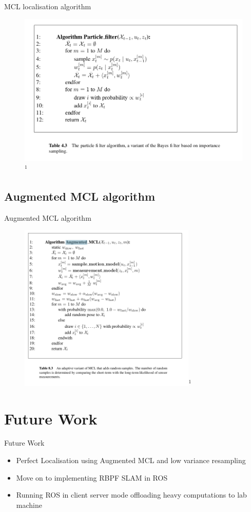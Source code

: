\documentclass{beamer}
\begin{document}
\begin{frame}{MCL localisation algorithm}
    \begin{figure}
        \centering
        \includegraphics[width=\textwidth]{./PF.png}$^{1}$
    \end{figure}
\end{frame}

\subsection{Augmented MCL algorithm}
\begin{frame}{Augmented MCL algorithm}
    \begin{figure}
        \centering
        \includegraphics[height = 80mm]{./Augmented.png}$^{1}$
    \end{figure}
\end{frame}


\section{Future Work}
\begin{frame}{Future Work}
\begin{itemize}
    \item Perfect Localisation using Augmented MCL and low variance resampling
    \item Move on to implementing RBPF SLAM in ROS 
    \item Running ROS in client server mode offloading heavy computations to lab machine 
\end{itemize}
\end{frame}
\end{document}
